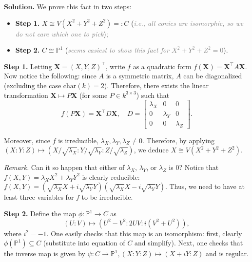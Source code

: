 \documentclass{template}
\begin{document}
\textbf{Solution.} We prove this fact in two steps:
\begin{itemize}
    \item \textbf{Step 1.} $X \cong V(X^2+Y^2+Z^2) =: C$
    (\textit{\textcolor{gray}{i.e., all conics are isomorphic, so we do not care
    which one to pick}});
    \item \textbf{Step 2.} $C \cong \mathbb{P}^1$
    (\textit{\textcolor{gray}{seems easiest to show this fact for
    $X^2+Y^2+Z^2=0$}}).  
\end{itemize}

\textbf{Step 1.} Letting $\mathbf{X}=(X,Y,Z)^{\top}$, write $f$ as a quadratic
form $f(\mathbf{X}) = \mathbf{X}^{\top}A\mathbf{X}$. Now notice the following:
since $A$ is a symmetric matrix, $A$ can be diagonalized (excluding the case
$\text{char}(k)=2$). Therefore, there exists the linear transformation
$\mathbf{X} \mapsto P\mathbf{X}$ (for some $P \in k^{3 \times 3}$) such that
\begin{equation*}
    f(P\mathbf{X}) = \mathbf{X}^{\top}D\mathbf{X}, \quad D = \begin{bmatrix}
        \lambda_X & 0 & 0 \\
        0 & \lambda_Y & 0 \\
        0 & 0 & \lambda_Z
    \end{bmatrix}.
\end{equation*}

Moreover, since $f$ is irreducible, $\lambda_X, \lambda_Y, \lambda_Z \neq 0$.
Therefore, by applying $(X:Y:Z) \mapsto
(X/\sqrt{\lambda_X}:Y/\sqrt{\lambda_Y}:Z/\sqrt{\lambda_Z})$, we deduce $X \cong
V(X^2+Y^2+Z^2)$.

\textit{Remark.} Can it so happen that either of $\lambda_X$, $\lambda_Y$, or
$\lambda_Z$ is $0$? Notice that $f(X,Y)=\lambda_XX^2+\lambda_YY^2$ is clearly
reducible:
$f(X,Y)=(\sqrt{\lambda_X}X+i\sqrt{\lambda_Y}Y)(\sqrt{\lambda_X}X-i\sqrt{\lambda_Y}Y)$.
Thus, we need to have at least three variables for $f$ to be irreducible.

\textbf{Step 2.} Define the map $\phi: \mathbb{P}^1 \to C$ as
\begin{equation*}
    (U:V) \mapsto (U^2-V^2:2UV:i(V^2+U^2)),
\end{equation*}
where $i^2=-1$. One easily checks that this map is an isomorphism: first,
clearly $\phi(\mathbb{P}^1) \subseteq C$ (substitute into equation of $C$ and
simplify). Next, one checks that the inverse map is given by $\psi: C \to
\mathbb{P}^1, (X:Y:Z) \mapsto (X+iY:Z)$ and is regular.
\end{document}
